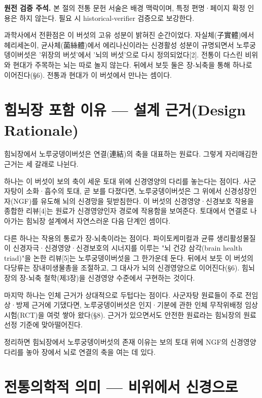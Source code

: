 \documentclass[12pt,oneside]{book}
\newenvironment{authnote}
  {\par\smallskip\begingroup\leftskip=6mm\rightskip=3mm\small\color{muted}\noindent\ignorespaces}
  {\par\endgroup\smallskip}
\begin{document}
\begin{authnote}\textbf{원전 검증 주석.} 본 절의 전통 문헌 서술은 배경 맥락이며, 특정 편명·페이지 확정 인용은 하지 않는다. 필요 시 historical-verifier 검증으로 보강한다.\end{authnote}

과학사에서 전환점은 이 버섯의 고유 성분이 밝혀진 순간이었다. 자실체(子實體)에서 헤리세논이, 균사체(菌絲體)에서 에리나신이라는 신경활성 성분이 규명되면서 노루궁뎅이버섯은 '위장의 버섯'에서 '뇌의 버섯'으로 다시 정의되었다[2]. 전통이 다스린 비위와 현대가 주목하는 뇌는 따로 놀지 않는다. 뒤에서 보듯 둘은 장-뇌축을 통해 하나로 이어진다(§6). 전통과 현대가 이 버섯에서 만나는 셈이다.

\section{힘뇌장 포함 이유 — 설계 근거(Design Rationale)}

힘뇌장에서 노루궁뎅이버섯은 연결(連結)의 축을 대표하는 원료다. 그렇게 자리매김한 근거는 세 갈래로 나뉜다.

하나는 이 버섯이 보의 축이 세운 토대 위에 신경영양의 다리를 놓는다는 점이다. 사군자탕이 소화·흡수의 토대, 곧 보를 다졌다면, 노루궁뎅이버섯은 그 위에서 신경성장인자(NGF)를 유도해 뇌의 신경망을 뒷받침한다. 이 버섯의 신경영양·신경보호 작용을 종합한 리뷰[4]는 원료가 신경영양인자 경로에 작용함을 보여준다. 토대에서 연결로 나아가는 힘뇌장 설계에서 자연스러운 다음 단계인 셈이다.

다른 하나는 작용의 통로가 장-뇌축이라는 점이다. 파이토케미컬과 균류 생리활성물질이 신경자극·신경영양·신경보호의 시너지를 이루는 "뇌 건강 삼각(brain health triad)"을 논한 리뷰[5]는 노루궁뎅이버섯을 그 한가운데 둔다. 뒤에서 보듯 이 버섯의 다당류는 장내미생물총을 조절하고, 그 대사가 뇌의 신경영양으로 이어진다(§6). 힘뇌장의 장-뇌축 철학(제3장)을 신경영양 수준에서 구현하는 것이다.

마지막 하나는 인체 근거가 상대적으로 두텁다는 점이다. 사군자탕 원료들이 주로 전임상·방제 근거에 기댔다면, 노루궁뎅이버섯은 인지·기분에 관한 인체 무작위배정 임상시험(RCT)을 여럿 쌓아 왔다(§8). 근거가 있으면서도 안전한 원료라는 힘뇌장의 원료 선정 기준에 맞아떨어진다.

정리하면 힘뇌장에서 노루궁뎅이버섯의 존재 이유는 보의 토대 위에 NGF의 신경영양 다리를 놓아 장에서 뇌로 연결의 축을 여는 데 있다.

\section{전통의학적 의미 — 비위에서 신경으로}
\end{document}
